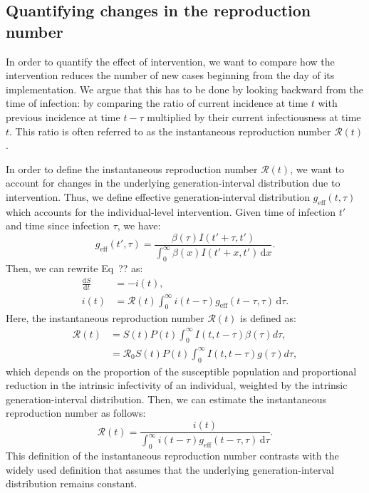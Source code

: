 \documentclass[12pt]{article}
\newcommand{\Rx}[1]{\ensuremath{{\mathcal R}_{#1}}\xspace}
\newcommand{\Ro}{\Rx{0}}
\newcommand{\RR}{\ensuremath{{\mathcal R}}\xspace}
\newcommand{\dd}[1]{\ensuremath{\, \mathrm{d}#1}}
\newcommand{\dtau}{\dd{\tau}}
\newcommand{\dx}{\dd{x}}
\newcommand{\geff}{g_{\textrm{eff}}} %
\begin{document}
\subsection{Quantifying changes in the reproduction number}

In order to quantify the effect of intervention, we want to compare how the intervention reduces the number of new cases beginning from the day of its implementation.
We argue that this has to be done by looking backward from the time of infection: by comparing the ratio of current incidence at time $t$ with previous incidence at time $t-\tau$ multiplied by their current infectiousness at time $t$.
This ratio is often referred to as the instantaneous reproduction number $\RR(t)$.

In order to define the instantaneous reproduction number $\RR(t)$, we want to account for changes in the underlying generation-interval distribution due to intervention.
Thus, we define effective generation-interval distribution $\geff(t, \tau)$ which accounts for the individual-level intervention.
Given time of infection $t'$ and time since infection $\tau$, we have:
\begin{equation}
\geff(t', \tau)= \frac{\beta(\tau)I(t'+\tau,t')}{\int_0^\infty \beta(x)I(t'+x,t') \dx}.
\end{equation}
Then, we can rewrite Eq~?? as:
\begin{equation}
\begin{aligned}
\frac{\mathrm{d}S}{\mathrm{d}t} &= - i(t),\\
i(t) &=  \mathcal R(t) \int_0^\infty i(t-\tau)  \geff(t-\tau, \tau) \dtau.
\end{aligned}
\end{equation}
Here, the instantaneous reproduction number $\RR(t)$ is defined as:
\begin{align}
\RR(t) &= S(t) P(t) \int_0^\infty I(t,t-\tau) \beta(\tau) d\tau,\\
&= \Ro S(t) P(t) \int_0^\infty I(t,t-\tau) g(\tau) d\tau,
\end{align}
which depends on the proportion of the susceptible population and proportional reduction in the intrinsic infectivity of an individual, weighted by the intrinsic generation-interval distribution.
Then, we can estimate the instantaneous reproduction number as follows:
\begin{equation}
\RR(t)= \frac{i(t)}{\int_0^\infty i(t-\tau) \geff(t-\tau, \tau) \dtau}.
\end{equation}
This definition of the instantaneous reproduction number contrasts with the widely used definition that assumes that the underlying generation-interval distribution remains constant.
\end{document}
